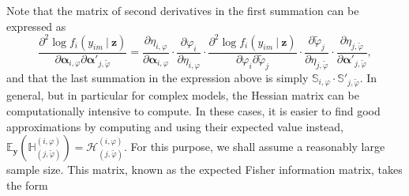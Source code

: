 \documentclass[11pt, a4paper]{article}
\newcommand{\R}{{\ensuremath{\mathbb{R}}}}
\newcommand{\cond}{\!~|~\!}
\begin{document}
Note that the matrix of second derivatives in the first summation can be expressed as
\begin{equation*}
\frac{\partial^2 \log f_i(y_{im} \cond \mathbf{z})}{\partial \bm{\alpha}_{i,\varphi} \partial \bm{\alpha}'_{j,\tilde{\varphi}}} = \frac{\partial \eta_{i,\varphi}}{\partial \bm{\alpha}_{i,\varphi}} \cdot  \frac{\partial \varphi_i}{\partial \eta_{i,\varphi}} \cdot \frac{\partial^2 \log f_i(y_{im} \cond \mathbf{z})}{ \partial \varphi_i \partial \tilde{\varphi}_j} \cdot \frac{\partial \tilde{\varphi}_j}{\partial \eta_{j,\tilde{\varphi}}} \cdot \frac{\partial \eta_{j,\tilde{\varphi}}}{\partial \bm{\alpha}'_{j,\tilde{\varphi}}}, 
\end{equation*}
and that the last summation in the expression above is simply $\mathbb{S}_{i,\varphi} \cdot \mathbb{S}'_{j,\tilde{\varphi}}$. In general, but in particular for complex models, the Hessian matrix can be computationally intensive to compute. In these cases, it is easier to find good approximations by computing and using their expected value instead, $\mathbb{E}_{\mathbf{y}}(\mathbb{H}^{(i,\varphi)}_{(j,\tilde{\varphi})}) = \mathcal{H}^{(i,\varphi)}_{(j,\tilde{\varphi})}$. For this purpose, we shall assume a reasonably large sample size. This matrix, known as the expected Fisher information matrix, takes the form
\end{document}
